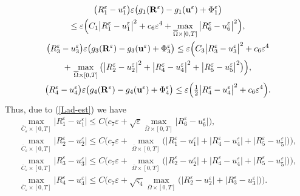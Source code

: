 \documentclass[reqno]{amsart}            %
\numberwithin{equation}{section}
\begin{document}
\begin{gather}
\big(R^\varepsilon_1 -  u^\varepsilon_1 \big) \varepsilon \big(g_1({\bf R}^\varepsilon) - g_1({\bf u}^\varepsilon) + \Phi^\varepsilon_1\big)\notag
\\
\le \varepsilon \Big(C_1 \big|R^\varepsilon_1 -  u^\varepsilon_1 \big|^2 + c_6 \varepsilon^4 + \max_{\overline{\Omega}\times [0,T]} \big|R^\varepsilon_6 -  u^\varepsilon_6 \big|^2\Big),
\\
\big(R^\varepsilon_3 -  u^\varepsilon_3 \big) \varepsilon \big(g_3({\bf R}^\varepsilon) - g_3({\bf u}^\varepsilon) + \Phi^\varepsilon_3\big) \le \varepsilon \Big(C_3 \big|R^\varepsilon_3 -  u^\varepsilon_3 \big|^2 + c_6 \varepsilon^4 \notag
\\
 + \, \max_{\overline{\Omega}\times [0,T]}\big(\big|R^\varepsilon_2 -  u^\varepsilon_2 \big|^2+ \big|R^\varepsilon_4 -  u^\varepsilon_4 \big|^2 + \big|R^\varepsilon_5 -  u^\varepsilon_5 \big|^2 \big)\Big),
\\
\big(R^\varepsilon_4 -  u^\varepsilon_4 \big) \varepsilon \big(g_4({\bf R}^\varepsilon) - g_4({\bf u}^\varepsilon) + \Phi^\varepsilon_4\big) \le
 \varepsilon \Big( \tfrac12 \big|R^\varepsilon_4 -  u^\varepsilon_4 \big|^2 + c_6 \varepsilon^4\Big).\label{in-11}
\end{gather}
Thus, due to (\ref{Lad-est}) we have
\begin{gather}\label{in-1}
  \max_{\overline{C}_\varepsilon\times [0,T]} \big|R^\varepsilon_1 -  u^\varepsilon_1 \big| \le
  C\Big( c_7 \varepsilon + \sqrt{\varepsilon} \max_{\overline{\Omega}\times [0,T]} \big|R^\varepsilon_6 -  u^\varepsilon_6 \big| \Big),
\\\label{in-2}
  \max_{\overline{C}_\varepsilon\times [0,T]} \big|R^\varepsilon_2 -  u^\varepsilon_2 \big| \le
C\Big( c_7 \varepsilon + \max_{\overline{\Omega}\times [0,T]}\big(\big|R^\varepsilon_1 -  u^\varepsilon_1 \big|+ \big|R^\varepsilon_4 -  u^\varepsilon_4 \big| + \big|R^\varepsilon_5 -  u^\varepsilon_5 \big| \big)\Big),
\\\label{in-3}
  \max_{\overline{C}_\varepsilon\times [0,T]} \big|R^\varepsilon_3 -  u^\varepsilon_3 \big| \le
C\Big( c_7 \varepsilon + \max_{\overline{\Omega}\times [0,T]}\big(\big|R^\varepsilon_2 -  u^\varepsilon_2 \big|+ \big|R^\varepsilon_4 -  u^\varepsilon_4 \big| + \big|R^\varepsilon_5 -  u^\varepsilon_5 \big| \big)\Big),
\\\label{in-4}
  \max_{\overline{C}_\varepsilon\times [0,T]} \big|R^\varepsilon_4 -  u^\varepsilon_4 \big| \le
  C\Big( c_7 \varepsilon
  + \sqrt{\varsigma_4} \max_{\overline{\Omega}\times [0,T]}\big(\big|R^\varepsilon_2 -  u^\varepsilon_2 \big|+ \big|R^\varepsilon_3 -  u^\varepsilon_3 \big| \big)\Big).
\end{gather}
\end{document}
